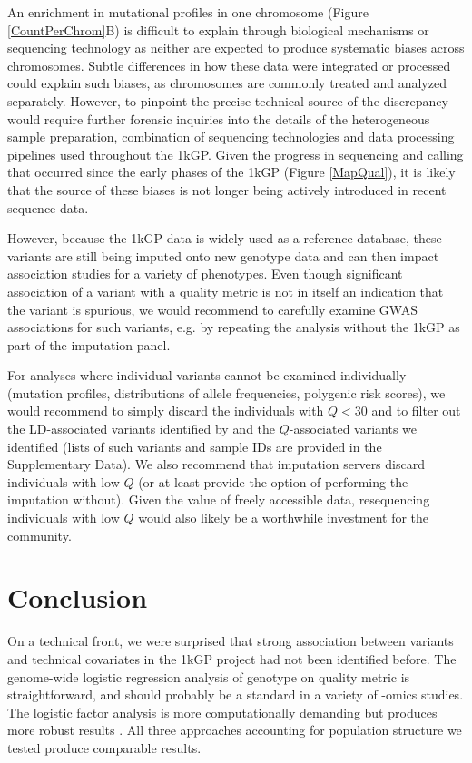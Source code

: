 \documentclass[9pt,article]{template}
\begin{document}
An enrichment in mutational profiles in one chromosome (Figure \ref{CountPerChrom}B) is difficult to explain through biological mechanisms or sequencing technology as neither are expected to produce systematic biases across chromosomes. 
Subtle differences in how these data were integrated or processed could explain such biases, as chromosomes are commonly treated and analyzed separately. 
However, to pinpoint the precise technical source of the discrepancy would require further forensic inquiries into the details of the heterogeneous sample preparation, combination of sequencing technologies and data processing pipelines used throughout the 1kGP. 
Given the progress in sequencing and calling that occurred since the early phases of the 1kGP (Figure \ref{MapQual}), it is likely that the source of these biases is not longer being actively introduced in recent sequence data.

However, because the 1kGP data is widely used as a reference database, these variants are still being imputed onto new genotype data and can then impact association studies for a variety of phenotypes. 
Even though significant association of a variant with a quality metric is not in itself an indication that the variant is spurious, we would recommend to carefully examine GWAS associations for such variants, e.g. by repeating the analysis without the 1kGP as part of the imputation panel. 

For analyses where individual variants cannot be examined individually (mutation profiles, distributions of allele frequencies, polygenic risk scores), we would recommend to simply discard the individuals with $Q<30$ and to filter out the LD-associated variants identified by \cite{mafessoni2018turning} and the $Q$-associated variants we identified (lists of such variants and sample IDs are provided in the Supplementary Data). We also recommend that imputation servers discard individuals with low $Q$ (or at least provide the option of performing the imputation without). Given the value of freely accessible data, resequencing individuals with low $Q$ would  also likely be a worthwhile investment for the community. 

\section{Conclusion}

On a technical front, we were surprised that strong association between variants and technical covariates in the 1kGP project had not been identified before. 
The genome-wide logistic regression analysis of genotype on quality metric is straightforward, and should probably be a standard in a variety of -omics studies. 
The logistic factor analysis is more computationally demanding but produces more robust results \citep{song2015testing}. 
All three approaches accounting for population structure we tested produce comparable results.  
\end{document}
